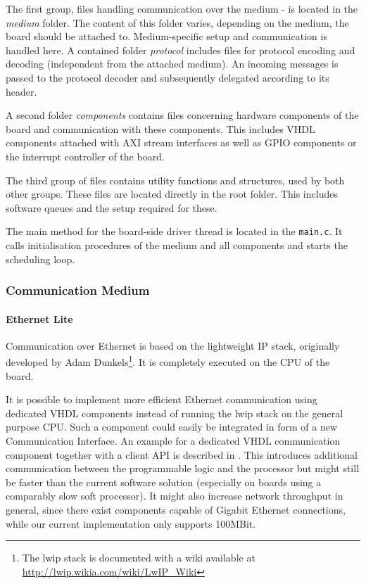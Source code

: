 \documentclass{report}
\begin{document}
The first group, files handling communication over the medium - is located in the \textit{medium} folder. The content of this folder varies, depending on the medium, the board should be attached to. Medium-specific setup and communication is handled here. A contained folder \textit{protocol} includes files for protocol encoding and decoding (independent from the attached medium). An incoming messages is passed to the protocol decoder and subsequently delegated according to its header.

A second folder \textit{components} contains files concerning hardware components of the board and communication with these components. This includes VHDL components attached with AXI stream interfaces as well as GPIO components or the interrupt controller of the board.

The third group of files contains utility functions and structures, used by both other groups. These files are located directly in the root folder.  This includes software queues and the setup required for these.

The main method for the board-side driver thread is located in the \texttt{main.c}. It calls initialisation procedures of the medium and all components and starts the scheduling loop.

\subsubsection{Communication Medium}

\paragraph{Ethernet Lite}
Communication over Ethernet is based on the lightweight IP stack, originally developed by Adam Dunkels\footnote{The lwip stack is documented with a wiki available at \url{http://lwip.wikia.com/wiki/LwIP_Wiki}}. It is completely executed on the CPU of the board.

It is possible to implement more efficient Ethernet communication using dedicated VHDL components instead of running the lwip stack on the general purpose CPU. Such a component could easily be integrated in form of a new Communication Interface. An example for a dedicated VHDL communication component together with a client API is described in \cite{alachiotis10, alachiotis12}. This introduces additional communication between the programmable logic and the processor but might still be faster than the current software solution (especially on boards using a comparably slow soft processor). It might also increase network throughput in general, since there exist components capable of Gigabit Ethernet connections, while our current implementation only supports 100MBit.
\end{document}
